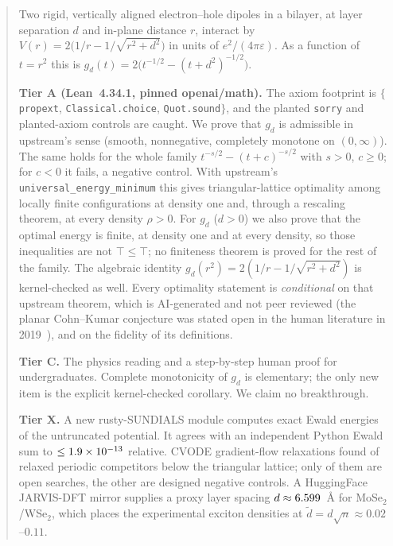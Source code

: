 \documentclass[11pt]{article}
\theoremstyle{remark}
\newcommand{\lean}[1]{\texttt{#1}}
\newcommand{\dt}{\tilde d}
\begin{document}
\begin{abstract}
Two rigid, vertically aligned electron--hole dipoles in a bilayer, at layer separation $d$ and in-plane distance $r$,
interact by $V(r)=2\bigl(1/r-1/\sqrt{r^2+d^2}\bigr)$ in units of $e^2/(4\pi\varepsilon)$. As a function of $t=r^2$ this
is $g_d(t)=2\bigl(t^{-1/2}-(t+d^2)^{-1/2}\bigr)$.

\textbf{Tier A (Lean~4.34.1, pinned openai/math).} The axiom footprint is $\{$\lean{propext}, \lean{Classical.choice},
\lean{Quot.sound}$\}$, and the planted \lean{sorry} and planted-axiom controls are caught. We prove that $g_d$ is
admissible in upstream's sense (smooth, nonnegative, completely monotone on $(0,\infty)$). The same holds for the whole
family $t^{-s/2}-(t+c)^{-s/2}$ with $s>0$, $c\ge0$; for $c<0$ it fails, a negative control. With upstream's
\lean{universal\_energy\_minimum} this gives triangular-lattice optimality among locally finite configurations at
density one and, through a rescaling theorem, at every density $\rho>0$. For $g_d$ ($d>0$) we also prove that the
optimal energy is finite, at density one and at every density, so those inequalities are not $\top\le\top$; no finiteness
theorem is proved for the rest of the family. The algebraic identity $g_d(r^2)=2(1/r-1/\sqrt{r^2+d^2})$ is
kernel-checked as well. Every optimality statement is \emph{conditional} on that upstream
theorem, which is AI-generated and not peer reviewed (the planar Cohn--Kumar conjecture was stated open in the human
literature in 2019~\cite{ps}), and on the fidelity of its definitions.

\textbf{Tier C.} The physics reading and a step-by-step human proof for undergraduates. Complete monotonicity of $g_d$
is elementary; the only new item is the explicit kernel-checked corollary. We claim no breakthrough.

\textbf{Tier X.} A new rusty-SUNDIALS module computes exact Ewald energies of the untruncated potential. It agrees with an
independent Python Ewald sum to $\le\DXIcEwaldSq$ relative. CVODE gradient-flow relaxations found
\DXNUndercut{} of \DXNComp{} relaxed periodic competitors below the triangular lattice; only \DXNOpen{} of them are open
searches, the other \DXNDesignedNeg{} are designed negative controls. A HuggingFace JARVIS-DFT mirror
supplies a proxy layer spacing $d\approx\DXDproxyA$~\AA{} for MoSe$_2$/WSe$_2$, which places the experimental exciton
densities at $\dt=d\sqrt n\approx0.02$--$0.11$.
\end{abstract}
\end{document}
